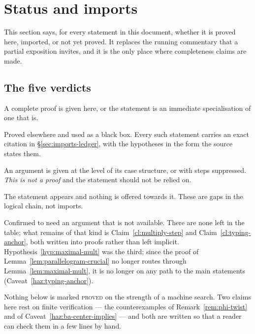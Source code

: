 \section{Status and imports}\label{sec:status}

This section says, for every statement in this document, whether it is proved
here, imported, or not yet proved. It replaces the running commentary that a
partial exposition invites, and it is the only place where completeness claims
are made.

\subsection{The five verdicts}\label{sec:verdicts}

\begin{description}\tightlist
\item[\textsc{proved}] A complete proof is given here, or the statement is an
  immediate specialisation of one that is.
\item[\textsc{imported}] Proved elsewhere and used as a black box. Every such
  statement carries an exact citation in \S\ref{sec:imports-ledger}, with the
  hypotheses in the form the source states them.
\item[\textsc{outlined}] An argument is given at the level of its case
  structure, or with steps suppressed. \emph{This is not a proof} and the
  statement should not be relied on.
\item[\textsc{stated}] The statement appears and nothing is offered towards it.
  These are gaps in the logical chain, not imports.
\item[\textsc{open}] Confirmed to need an argument that is not available.
  There are none left in the table; what remains of that kind is
  Claim~\ref{cl:multiply-step} and Claim~\ref{cl:typing-anchor}, both
  written into proofs rather than left implicit.
  Hypothesis~\ref{hyp:maximal-mult} was the third; since the proof of
  Lemma~\ref{lem:parallelogram-crucial} no longer routes through
  Lemma~\ref{lem:maximal-mult}, it is no longer on any path to the main
  statements (Caveat~\ref{haz:typing-anchor}).
\end{description}

Nothing below is marked \textsc{proved} on the strength of a machine search.
Two claims here rest on finite verification --- the counterexamples of
Remark~\ref{rem:phi-twist} and of Caveat~\ref{haz:ba-center-implies} --- and
both are written so that a reader can check them in a few lines by hand.

